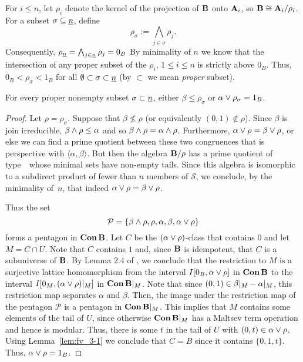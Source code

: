 For $i \leq n$, let $\rho_i$ denote the kernel of the projection of $\mathbf{B}$ onto $\mathbf{A}_i$,
so $\mathbf{B} \cong \mathbf{A}_i/\rho_i$.
For a subset $\sigma \subseteq \underline{n}$, define
\[
\rho_\sigma := \bigwedge_{j\in \sigma} \rho_j.
\]
Consequently,
$\rho_{\underline{n}} = \bigwedge_{j\in \underline{n}}\rho_j = 0_{B}$
By minimality of $n$ we know that the intersection of any  proper subset of the
$\rho_i$, $1 \leq i \leq n$ is strictly above $0_B$.  Thus,
$0_B < \rho_\sigma < 1_B$ for all 
$\emptyset \subset \sigma\subset \underline{n}$
(by $\subset$ we mean \emph{proper} subset).

\begin{lemma}
  \label{lem:fv_3-2}
  For every proper nonempty subset $\sigma \subset \underline{n}$,
  either $\beta \leq \rho_\sigma$ or $\alpha \join \rho_\sigma = 1_B$.
\end{lemma}
\begin{proof} Let $\rho = \rho_\sigma$.
Suppose that $\beta \not\le {\rho}$ (or equivalently $(0,1) \notin
\rho$). Since $\beta$ is join irreducible, $\beta\meet\rho \le
\alpha$ and so $\beta\meet \rho = \alpha \meet \rho$.  Furthermore,
$\alpha\join {\rho} = \beta \join {\rho}$, or else we can find a
prime quotient between these two congruences that is perspective
with $\langle \alpha, \beta \rangle$.  But then the algebra 
$\mathbf{B}/{\rho}$ has a prime quotient of type~\atyp\ whose minimal sets have non-empty
tails.  Since this algebra is isomorphic to a subdirect product of
fewer than $n$ members of $\mathcal S$, we conclude, by the minimality 
of~$n$, that indeed $\alpha\join {\rho} = \beta \join {\rho}$.

Thus the set
\[
\mathcal P = \{\beta\meet\rho, \rho, \alpha, \beta, \alpha\join\rho\}
\]
forms a pentagon in $\operatorname{\mathbf{Con}} \mathbf{B}$. Let $C$ be the
$(\alpha\join\rho)$-class that contains $0$ and let $M = C\mathrel{\cap} U$.
Note that $C$ contains $1$ and, since $\mathbf{B}$ is idempotent,  that
$C$ is a subuniverse of $\mathbf{B}$. By Lemma 2.4 of \cite{HM:1988}, we
conclude that the restriction to $M$ is a surjective lattice
homomorphism from the interval $I[0_B,
\alpha\join\rho]$ in $\operatorname{\mathbf{Con}}{\mathbf{B}}$ to the interval $I[0_M,
(\alpha\join\rho)|_M]$ in $\operatorname{\mathbf{Con}}{\mathbf{B}}|_M$.  Note that since $(0,1) \in
\beta|_M - \alpha|_M$, this restriction map separates
$\alpha$ and $\beta$.  Then, the image under the restriction map of
the pentagon $\mathcal P$ is a pentagon in $\operatorname{\mathbf{Con}}{\mathbf{B}}|_M$.  This
implies that $M$ contains some elements of the tail of $U$, since
otherwise $\operatorname{\mathbf{Con}}{\mathbf{B}}|_M$ has a Maltsev term operation and hence  
is modular.
Thus, there is some $t$ in the tail of $U$ with $(0,t) \in
\alpha\join \rho$. Using Lemma~\ref{lem:fv_3-1} we conclude that $C =
B$ since it contains $\{0,1,t\}$.  Thus, $\alpha \join \rho = 1_B$.
\end{proof}

